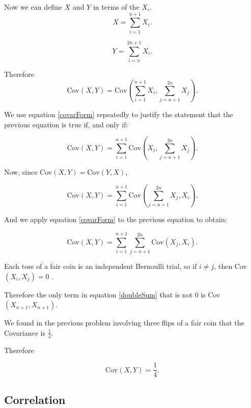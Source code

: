 \documentclass[a4paper,11pt]{article}
\begin{document}
Now we can define $X$ and $Y$ in terms of the $X_i$. 
\begin{equation}
X = \sum_{i=1}^{n+1} X_i.
\end{equation}

\begin{equation}
Y = \sum_{i=n}^{2n+1} X_i.
\end{equation}

Therefore
\begin{equation}
\text{Cov}\left( X, Y \right) = 
  \text{Cov}\left(\sum_{i=1}^{n+1} X_i, \sum_{j=n+1}^{2n} X_j \right).
\end{equation}

We use equation \ref{covarForm} repeatedly to justify the statement that
the previous equation is true if, and only if:

\begin{equation}
\text{Cov}\left( X, Y \right) = 
  \sum_{i=1}^{n+1} \text{Cov}\left(X_i, \sum_{j=n+1}^{2n} X_j \right).
\end{equation}

Now, since Cov$\left(X, Y \right) = \text{Cov}\left(Y, X \right)$,

\begin{equation}
\text{Cov}\left( X, Y \right) = 
  \sum_{i=1}^{n+1} \text{Cov}\left(\sum_{j=n+1}^{2n} X_j , X_i \right).
\end{equation}

And we apply equation \ref{covarForm} to the previous equation to obtain:

\begin{equation}\label{doubleSum}
\text{Cov}\left( X, Y \right) = 
  \sum_{i=1}^{n+1} \sum_{j=n+1}^{2n}\text{Cov}\left(X_j , X_i \right).
\end{equation}

Each toss of a fair coin is an independent Bernoulli trial, so if $i \neq j$,
then Cov$\left(X_i, X_j\right) = 0$ \cite{reading7b}.

Therefore the only term in equation \ref{doubleSum} that is not 0 is
Cov$\left(X_{n+1}, X_{n+1} \right)$.

We found in the previous problem involving three flips of a fair coin
that the Covariance is $\frac{1}{4}$.

Therefore 

\begin{equation}
\text{Cov}\left( X, Y \right) = \frac{1}{4}.
\end{equation}

\subsection{Correlation}
\end{document}

